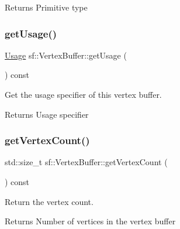 \begin{DoxyReturn}{Returns}
Primitive type \begin{DoxyVerb}\end{DoxyVerb}
 
\end{DoxyReturn}
\mbox{\label{classsf_1_1_vertex_buffer_a5e36f2b3955bb35648c17550a9c096e1}} 
\subsubsection{\texorpdfstring{getUsage()}{getUsage()}}
{\footnotesize\ttfamily \mbox{\hyperlink{classsf_1_1_vertex_buffer_a3a531528684e63ecb45edd51282f5cb7}{Usage}} sf\+::\+Vertex\+Buffer\+::get\+Usage (\begin{DoxyParamCaption}{ }\end{DoxyParamCaption}) const}



Get the usage specifier of this vertex buffer. 

\begin{DoxyReturn}{Returns}
Usage specifier \begin{DoxyVerb}\end{DoxyVerb}
 
\end{DoxyReturn}
\mbox{\label{classsf_1_1_vertex_buffer_a6c534536ed186a2ad65e75484c8abafe}} 
\subsubsection{\texorpdfstring{getVertexCount()}{getVertexCount()}}
{\footnotesize\ttfamily std\+::size\+\_\+t sf\+::\+Vertex\+Buffer\+::get\+Vertex\+Count (\begin{DoxyParamCaption}{ }\end{DoxyParamCaption}) const}



Return the vertex count. 

\begin{DoxyReturn}{Returns}
Number of vertices in the vertex buffer \begin{DoxyVerb}\end{DoxyVerb}
 
\end{DoxyReturn}
\mbox{\label{classsf_1_1_vertex_buffer_a6304bc4134dc0164dc94eff887b08847}} 
